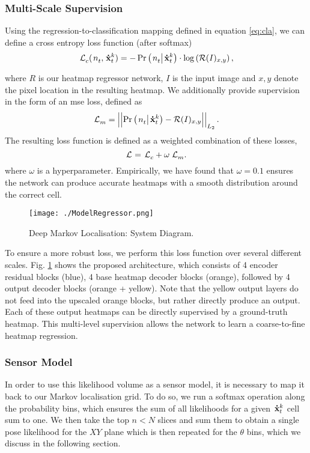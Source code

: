 \documentclass[letterpaper, 10 pt, conference]{ieeeconf}  %
\begin{document}
\subsubsection{Multi-Scale Supervision}
Using the regression-to-classification mapping defined in equation \ref{eq:cla}, we can define a cross entropy loss function (after softmax)
\begin{equation}
    \myloss{c}(\easysca{n}{t}{}, \pose{\mytime}{k}) = -\condprob{\easysca{n}{t}{}}{\pose{\mytime}{k}} \cdot \log\mypar{\mathcal{R}(I)_{x,y}},
\end{equation}
where \ensuremath{R} is our heatmap regressor network, \ensuremath{I} is the input image and \ensuremath{x,y} denote the pixel location in the resulting heatmap.
We additionally provide supervision in the form of an \acs{mse} loss, defined as
\begin{equation}
    \myloss{m} = \left|\left| \condprob{\easysca{n}{t}{}}{\pose{\mytime}{k}} - \mathcal{R}(I)_{x,y} \right|\right|_{L_{2}}.
\end{equation}
The resulting loss function is defined as a weighted combination of these losses,
\begin{equation}
    \myloss{} = \myloss{c} + \omega \myloss{m}.
\end{equation}
where \ensuremath{\omega} is a hyperparameter.
Empirically, we have found that \ensuremath{\omega = 0.1} ensures the network can produce accurate heatmaps with a smooth distribution around the correct cell.

\begin{figure}
    \centering
    \texttt{[image: ./ModelRegressor.png]}  
    \caption{Deep Markov Localisation: System Diagram.}
    \vspace{-0.5cm}
    \label{fig:reg} 
\end{figure}
To ensure a more robust loss, we perform this loss function over several different scales.
Fig. \ref{fig:reg} shows the proposed architecture, which consists of 4 encoder residual blocks (blue), 4 base heatmap decoder blocks (orange), followed by 4 output decoder blocks (orange + yellow). Note that the yellow output layers do not feed into the upscaled orange blocks, but rather directly produce an output.
Each of these output heatmaps can be directly supervised by a ground-truth heatmap.
This multi-level supervision allows the network to learn a coarse-to-fine heatmap regression.

\subsubsection{Sensor Model}
In order to use this likelihood volume as a sensor model, it is necessary to map it back to our Markov localisation grid.
To do so, we run a softmax operation along the probability bins, which ensures the sum of all likelihoods for a given \ensuremath{\pose{\mytime}{k}} cell sum to one.
We then take the top \ensuremath{n < N} slices and sum them to obtain a single pose likelihood for the \ensuremath{XY} plane which is then repeated for the \ensuremath{\theta} bins, which we discuss in the following section.
\vspace{-1mm}
\end{document}
